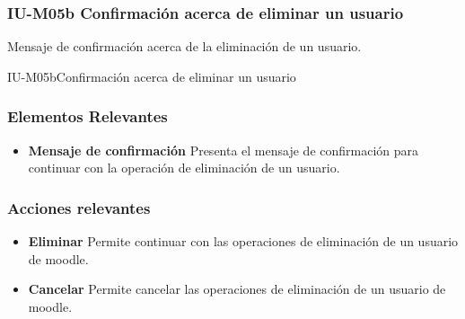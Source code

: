 
\subsubsection{IU-M05b Confirmación acerca de eliminar un usuario}

 Mensaje de confirmación acerca de la eliminación de un usuario.

        {IU-M05b}{Confirmación acerca de eliminar un usuario}

\subsubsection{Elementos Relevantes}

    \begin{itemize}
    \item {\bf Mensaje de confirmación}
        Presenta el mensaje de confirmación para continuar con la operación de
        eliminación de un usuario.
    \end{itemize}

\subsubsection{Acciones relevantes}

    \begin{itemize}
    \item {\bf Eliminar}
        Permite continuar con las operaciones de eliminación de un usuario
        de moodle.
        
    \item {\bf Cancelar}
        Permite cancelar las operaciones de eliminación de un usuario de moodle.
    \end{itemize}

\clearpage
